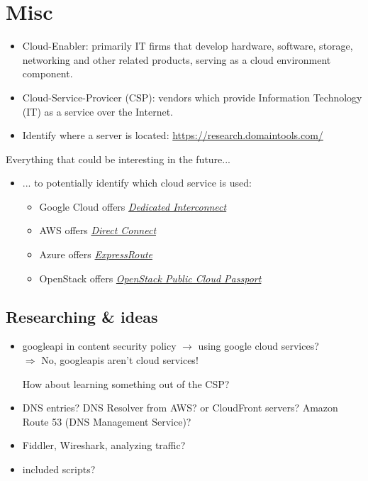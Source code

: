 \documentclass[12pt]{article}
\begin{document}
\section*{Misc}
\begin{itemize}
    \item Cloud-Enabler: primarily IT firms that develop hardware, software, storage, networking and other related products, serving as a cloud environment component.
    \item Cloud-Service-Provicer (CSP): vendors which provide Information Technology (IT) as a service over the Internet.
    \item Identify where a server is located: \url{https://research.domaintools.com/}
\end{itemize}
Everything that could be interesting in the future... 
\begin{itemize}
    \item ... to potentially identify which cloud service is used:
    \begin{itemize}
    \item Google Cloud offers \href{https://cloud.google.com/interconnect/docs/concepts/dedicated-overview}{\textit{Dedicated Interconnect}}
    \item AWS offers \href{https://aws.amazon.com/directconnect/}{\textit{Direct Connect}}
    \item Azure offers \href{https://azure.microsoft.com/en-us/services/expressroute/}{\textit{ExpressRoute}}
    \item OpenStack offers \href{https://www.openstack.org/passport/}{\textit{OpenStack Public Cloud Passport}}
\end{itemize}
\end{itemize}


\subsection*{Researching \& ideas}
\begin{itemize}
    \item googleapi in content security policy $\rightarrow$ using google cloud services? \\
    $\Rightarrow$ No, googleapis aren't cloud services!
    
    How about learning something out of the CSP?
    
    \item DNS entries? DNS Resolver from AWS? or CloudFront servers? Amazon Route 53 (DNS Management Service)?
    
    \item Fiddler, Wireshark, analyzing traffic?
    
    \item included scripts?
\end{itemize}
\end{document}
